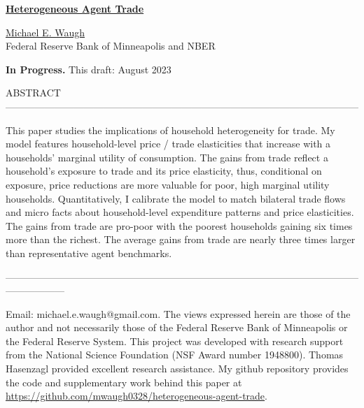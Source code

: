 \documentclass[12pt,pdftex]{article}
\begin{document}
\begin{onehalfspacing}

{\large \textbf{\href{https://www.waugheconomics.com/uploads/2/2/5/6/22563786/heterogeneous-agent-trade.pdf}{Heterogeneous Agent Trade}}}

\vspace{0.5cm}

\href{http://www.waugheconomics.com/}{Michael E. Waugh} \\ Federal Reserve Bank of Minneapolis and NBER

\vspace{0.5cm}

\textbf{In Progress.} This draft: August 2023

\vspace{1.5cm}


\normalsize

ABSTRACT ------------------------------------------------------------------------------------------------------------

This paper studies the implications of household heterogeneity for trade. My model features household-level price / trade elasticities that increase with a households' marginal utility of consumption. The gains from trade reflect a household's exposure to trade and its price elasticity, thus, conditional on exposure, price reductions are more valuable for poor, high marginal utility households. Quantitatively, I calibrate the model to match bilateral trade flows and micro facts about household-level expenditure patterns and price elasticities. The gains from trade are pro-poor with the poorest households gaining six times more than the richest. The average gains from trade are nearly three times larger than representative agent benchmarks.

------------------------------------------------------------------------------------------------------------------------------
%

\vspace{6.0cm}

\footnotesize Email: michael.e.waugh@gmail.com. The views expressed herein are those of the author and not necessarily those of the Federal Reserve Bank of Minneapolis or the Federal Reserve System. This project was developed with research support from the National Science Foundation (NSF Award number 1948800). Thomas Hasenzagl provided excellent research assistance. My github repository provides the code and supplementary work behind this paper at \url{https://github.com/mwaugh0328/heterogeneous-agent-trade}.


\end{onehalfspacing}
\end{document}
